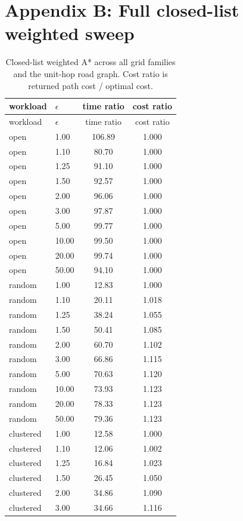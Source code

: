 \section*{Appendix B: Full closed-list weighted sweep}
\begin{longtable}{llcc}
\caption{Closed-list weighted A* across all grid families and the unit-hop road graph.  Cost ratio is returned path cost / optimal cost.}\label{tab:appendix-weighted}\\
\toprule
workload & $\epsilon$ & time ratio & cost ratio\\
\midrule
\endfirsthead
\toprule
workload & $\epsilon$ & time ratio & cost ratio\\
\midrule
\endhead
open & 1.00 & 106.89 & 1.000\\
open & 1.10 & 80.70 & 1.000\\
open & 1.25 & 91.10 & 1.000\\
open & 1.50 & 92.57 & 1.000\\
open & 2.00 & 96.06 & 1.000\\
open & 3.00 & 97.87 & 1.000\\
open & 5.00 & 99.77 & 1.000\\
open & 10.00 & 99.50 & 1.000\\
open & 20.00 & 99.74 & 1.000\\
open & 50.00 & 94.10 & 1.000\\
random & 1.00 & 12.83 & 1.000\\
random & 1.10 & 20.11 & 1.018\\
random & 1.25 & 38.24 & 1.055\\
random & 1.50 & 50.41 & 1.085\\
random & 2.00 & 60.70 & 1.102\\
random & 3.00 & 66.86 & 1.115\\
random & 5.00 & 70.63 & 1.120\\
random & 10.00 & 73.93 & 1.123\\
random & 20.00 & 78.33 & 1.123\\
random & 50.00 & 79.36 & 1.123\\
clustered & 1.00 & 12.58 & 1.000\\
clustered & 1.10 & 12.06 & 1.002\\
clustered & 1.25 & 16.84 & 1.023\\
clustered & 1.50 & 26.45 & 1.050\\
clustered & 2.00 & 34.86 & 1.090\\
clustered & 3.00 & 34.66 & 1.116\\

\end{longtable}

